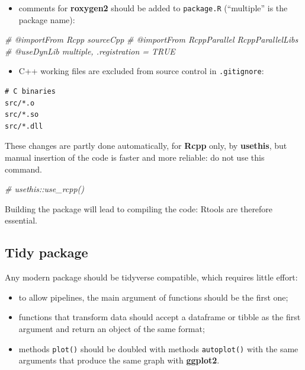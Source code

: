 \documentclass[
  12pt,
  american,
  a4paper,
  extrafontsizes,onecolumn,openright
  ]{memoir}
\newenvironment{Shaded}{\begin{snugshade}}{\end{snugshade}}
\newcommand{\CommentTok}[1]{\textcolor[rgb]{0.56,0.35,0.01}{\textit{#1}}}
\providecommand{\tightlist}{%
  \setlength{\itemsep}{0pt}\setlength{\parskip}{0pt}}
\begin{document}
\begin{itemize}
\tightlist
\item
  comments for \textbf{roxygen2} should be added to \texttt{package.R} (\enquote{multiple} is the package name):
\end{itemize}

\scriptsize

\begin{Shaded}
\begin{Highlighting}[]
\CommentTok{\#\textquotesingle{} @importFrom Rcpp sourceCpp}
\CommentTok{\#\textquotesingle{} @importFrom RcppParallel RcppParallelLibs}
\CommentTok{\#\textquotesingle{} @useDynLib multiple, .registration = TRUE}
\end{Highlighting}
\end{Shaded}

\normalsize

\begin{itemize}
\tightlist
\item
  C++ working files are excluded from source control in \texttt{.gitignore}:
\end{itemize}

\begin{verbatim}
# C binaries
src/*.o
src/*.so
src/*.dll
\end{verbatim}

These changes are partly done automatically, for \textbf{Rcpp} only, by \textbf{usethis}, but manual insertion of the code is faster and more reliable: do not use this command.

\scriptsize

\begin{Shaded}
\begin{Highlighting}[]
\CommentTok{\# usethis::use\_rcpp()}
\end{Highlighting}
\end{Shaded}

\normalsize

Building the package will lead to compiling the code: Rtools are therefore essential.

\hypertarget{tidy-package}{%
\subsection{Tidy package}\label{tidy-package}}

Any modern package should be tidyverse compatible, which requires little effort:

\begin{itemize}
\tightlist
\item
  to allow pipelines, the main argument of functions should be the first one;
\item
  functions that transform data should accept a dataframe or tibble as the first argument and return an object of the same format;
\item
  methods \texttt{plot()} should be doubled with methods \texttt{autoplot()} with the same arguments that produce the same graph with \textbf{ggplot2}.
\end{itemize}
\end{document}
